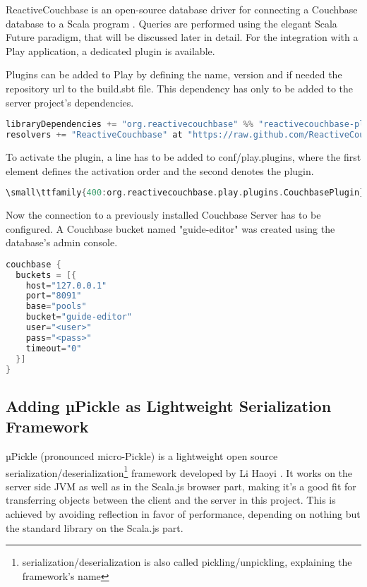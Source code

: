 ReactiveCouchbase is an open-source database driver for connecting a Couchbase database to a Scala program \cite{reactivecouchbase}. Queries are performed using the elegant Scala Future paradigm, that will be discussed later in detail. For the integration with a Play application, a dedicated plugin is available.

Plugins can be added to Play by defining the name, version and if needed the repository url to the build.sbt file. This dependency has only to be added to the server project's dependencies.

\begin{lstlisting}[caption={Adding ReactiveCouchbase to Play via build.sbt},basicstyle=\tiny\ttfamily,language=c,aboveskip=15pt]
libraryDependencies += "org.reactivecouchbase" %% "reactivecouchbase-play" % "0.3"
resolvers += "ReactiveCouchbase" at "https://raw.github.com/ReactiveCouchbase/repository/master/releases"
\end{lstlisting}

To activate the plugin, a line has to be added to conf/play.plugins, where the first element defines the activation order and the second denotes the plugin.

\begin{lstlisting}[caption={Activating the plugins via play.plugins},basicstyle=\tiny\ttfamily,language=c,aboveskip=15pt]
\small\ttfamily{400:org.reactivecouchbase.play.plugins.CouchbasePlugin}
\end{lstlisting}

Now the connection to a previously installed Couchbase Server has to be configured. A Couchbase bucket named "guide-editor" was created using the database's admin console.

\begin{lstlisting}[caption={Attaching the driver to the local Couchbase Server},basicstyle=\tiny\ttfamily,language=c,aboveskip=15pt]
couchbase {
  buckets = [{
    host="127.0.0.1"
    port="8091"
    base="pools"
    bucket="guide-editor"
    user="<user>"
    pass="<pass>"
    timeout="0"
  }]
}
\end{lstlisting}

\subsection{Adding µPickle as Lightweight Serialization Framework}

µPickle (pronounced micro-Pickle) is a lightweight open source serialization/deserialization\footnote{serialization/deserialization is also called pickling/unpickling, explaining the framework's name} framework developed by Li Haoyi \cite{upickle}.
It works on the server side JVM as well as in the Scala.js browser part, making it's a good fit for transferring objects between the client and the server in this project. This is achieved by avoiding reflection in favor of performance, depending on nothing but the standard library on the Scala.js part.


